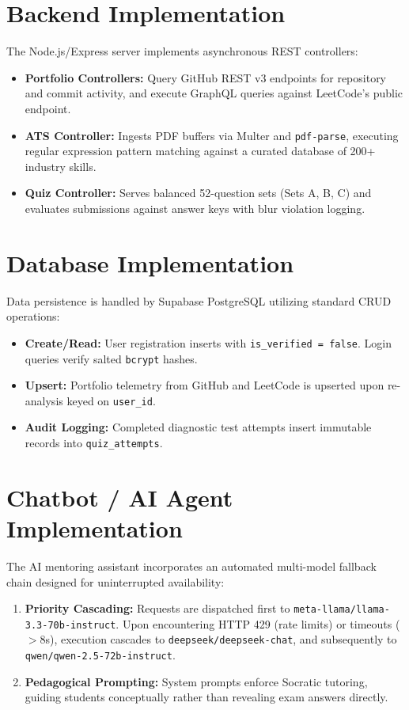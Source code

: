 \section{Backend Implementation}
The Node.js/Express server implements asynchronous REST controllers:
\begin{itemize}
    \item \textbf{Portfolio Controllers:} Query GitHub REST v3 endpoints for repository and commit activity, and execute GraphQL queries against LeetCode's public endpoint.
    \item \textbf{ATS Controller:} Ingests PDF buffers via Multer and \texttt{pdf-parse}, executing regular expression pattern matching against a curated database of 200+ industry skills.
    \item \textbf{Quiz Controller:} Serves balanced 52-question sets (Sets A, B, C) and evaluates submissions against answer keys with blur violation logging.
\end{itemize}

\section{Database Implementation}
Data persistence is handled by Supabase PostgreSQL utilizing standard CRUD operations:
\begin{itemize}
    \item \textbf{Create/Read:} User registration inserts with \texttt{is\_verified = false}. Login queries verify salted \texttt{bcrypt} hashes.
    \item \textbf{Upsert:} Portfolio telemetry from GitHub and LeetCode is upserted upon re-analysis keyed on \texttt{user\_id}.
    \item \textbf{Audit Logging:} Completed diagnostic test attempts insert immutable records into \texttt{quiz\_attempts}.
\end{itemize}

\section{Chatbot / AI Agent Implementation}
The AI mentoring assistant incorporates an automated multi-model fallback chain designed for uninterrupted availability:
\begin{enumerate}
    \item \textbf{Priority Cascading:} Requests are dispatched first to \texttt{meta-llama/llama-3.3-70b-instruct}. Upon encountering HTTP 429 (rate limits) or timeouts ($>8$s), execution cascades to \texttt{deepseek/deepseek-chat}, and subsequently to \texttt{qwen/qwen-2.5-72b-instruct}.
    \item \textbf{Pedagogical Prompting:} System prompts enforce Socratic tutoring, guiding students conceptually rather than revealing exam answers directly.
\end{enumerate}

